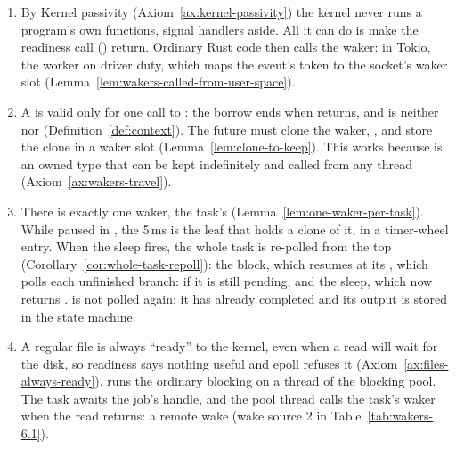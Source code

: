 \begin{Answer}
    \begin{enumerate}
        \item By Kernel passivity (Axiom~\ref{ax:kernel-passivity}) the kernel never runs a program's own functions, signal handlers aside. All it can do is make the readiness call () return. Ordinary Rust code then calls the waker: in Tokio, the worker on driver duty, which maps the event's token to the socket's waker slot (Lemma~\ref{lem:wakers-called-from-user-space}).
        \item A  is valid only for one call to : the borrow ends when  returns, and  is neither  nor  (Definition~\ref{def:context}). The future must clone the waker, , and store the clone in a waker slot (Lemma~\ref{lem:clone-to-keep}). This works because  is an owned  type that can be kept indefinitely and called from any thread (Axiom~\ref{ax:wakers-travel}).
        \item There is exactly one waker, the task's (Lemma~\ref{lem:one-waker-per-task}). While paused in , the 5\,ms  is the leaf that holds a clone of it, in a timer-wheel entry. When the sleep fires, the whole task is re-polled from the top (Corollary~\ref{cor:whole-task-repoll}): the  block, which resumes at its , which polls each unfinished branch:  if it is still pending, and the sleep, which now returns .  is not polled again; it has already completed and its output is stored in the state machine.
        \item A regular file is always ``ready'' to the kernel, even when a read will wait for the disk, so readiness says nothing useful and epoll refuses it (Axiom~\ref{ax:files-always-ready}).  runs the ordinary blocking  on a thread of the blocking pool. The task awaits the job's handle, and the pool thread calls the task's waker when the read returns: a remote wake (wake source 2 in Table~\ref{tab:wakers-6.1}).
    \end{enumerate}
\end{Answer}
